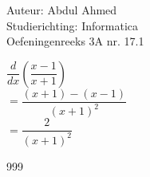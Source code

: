 \documentclass[a4paper]{article}
\begin{document}
  
\noindent \large Auteur: Abdul Ahmed \\
\noindent \large Studierichting: Informatica\\
\noindent \large Oefeningenreeks 3A nr. 17.1\\

\medskip

\normalsize

$\dfrac{d}{dx}\left(\dfrac{x-1}{x+1}\right)$\\

$=\dfrac{\left(x+1\right)-\left(x-1\right)}{\left(x+1\right)^2}$\\

$=\dfrac{2}{\left(x+1\right)^2}$\\


\begin{thebibliography}{999}
\end{thebibliography}
\end{document}
